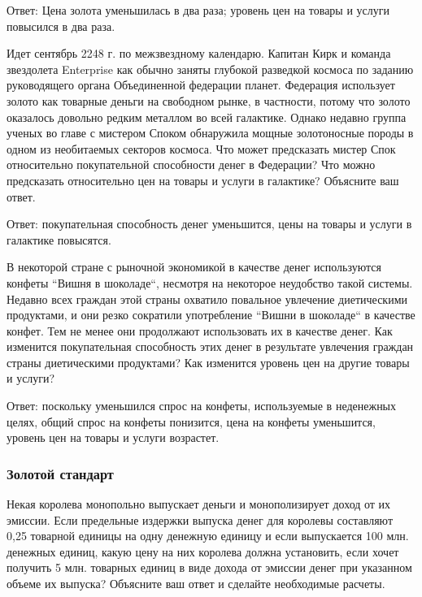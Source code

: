 \documentclass[12pt, table, a4paper,twoside]{exam}
\begin{document}
\begin{questions}
\begin{solution}[12em]

Ответ: Цена золота уменьшилась в два раза; уровень цен на товары и услуги повысился в два раза.

\end{solution}

\question[10] Идет сентябрь 2248 г. по межзвездному календарю. Капитан Кирк и команда звездолета Enterprise как обычно заняты глубокой разведкой космоса по заданию руководящего органа Объединенной федерации планет. Федерация использует золото как товарные деньги на свободном рынке, в частности, потому что золото оказалось довольно редким металлом во всей галактике. Однако недавно группа ученых во главе с мистером Споком обнаружила мощные золотоносные породы в одном из необитаемых секторов космоса. Что может предсказать мистер Спок относительно покупательной способности денег в Федерации? Что можно предсказать относительно цен на товары и услуги в галактике? Объясните ваш ответ.

\begin{solution}[12em]

Ответ: покупательная способность денег уменьшится, цены на товары и услуги в галактике повысятся.

\end{solution}


\question[10] В некоторой стране с рыночной экономикой в качестве денег используются конфеты ``Вишня в шоколаде``, несмотря на некоторое неудобство такой системы. Недавно всех граждан этой страны охватило повальное увлечение диетическими продуктами, и они резко сократили употребление ``Вишни в шоколаде`` в качестве конфет. Тем не менее они продолжают использовать их в качестве денег. Как изменится покупательная способность этих денег в результате увлечения граждан страны диетическими продуктами? Как изменится уровень цен на другие товары и услуги?

\begin{solution}[12em]
	
Ответ: поскольку уменьшился спрос на конфеты, используемые в неденежных целях, общий спрос на конфеты понизится, цена на конфеты уменьшится, уровень цен на товары и услуги возрастет.
	
\end{solution}



\subsubsection{Золотой стандарт}
\question[10] Некая королева монопольно выпускает деньги и монополизирует доход от их эмиссии. Если предельные издержки выпуска денег для королевы составляют 0,25 товарной единицы на одну денежную единицу и если выпускается 100 млн. денежных единиц, какую цену на них королева должна установить, если хочет получить 5 млн. товарных единиц в виде дохода от эмиссии денег при указанном объеме их выпуска? Объясните ваш ответ и сделайте необходимые расчеты.


\end{questions}
\end{document}
